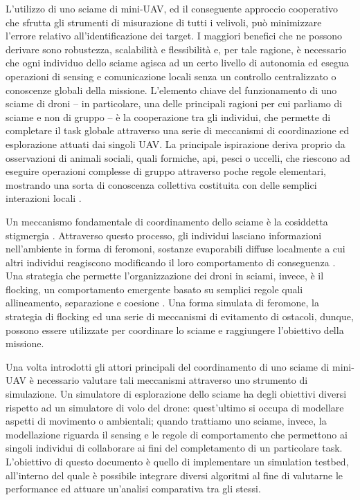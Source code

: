 L'utilizzo di uno sciame di mini-UAV, ed il conseguente approccio cooperativo che sfrutta gli strumenti di misurazione di tutti i velivoli, può minimizzare l'errore relativo all'identificazione dei target. 
I maggiori benefici che ne possono derivare sono robustezza, scalabilità e flessibilità e, per tale ragione, è necessario che ogni individuo dello sciame agisca ad un certo livello di autonomia ed esegua operazioni di sensing e comunicazione locali senza un controllo centralizzato o conoscenze globali della missione. 
L’elemento chiave del funzionamento di uno sciame di droni – in particolare, una delle principali ragioni per cui parliamo di sciame e non di gruppo – è la cooperazione tra gli individui, che permette di completare il task globale attraverso una serie di meccanismi di coordinazione ed esplorazione attuati dai singoli UAV. 
La principale ispirazione deriva proprio da osservazioni di animali sociali, quali formiche, api, pesci o uccelli, che riescono ad eseguire operazioni complesse di gruppo attraverso poche regole elementari, mostrando una sorta di conoscenza collettiva costituita con delle semplici interazioni locali \cite{brambilla2013swarm}.

Un meccanismo fondamentale di coordinamento dello sciame è la cosiddetta stigmergia \cite{sauter2005performance}. 
Attraverso questo processo, gli individui lasciano informazioni nell’ambiente in forma di feromoni, sostanze evaporabili diffuse localmente a cui altri individui reagiscono modificando il loro comportamento di conseguenza \cite{parunak2002digital}. 
Una strategia che permette l’organizzazione dei droni in sciami, invece, è il flocking, un comportamento emergente basato su semplici regole quali allineamento, separazione e coesione \cite{reynolds1987flocks}. 
Una forma simulata di feromone, la strategia di flocking ed una serie di meccanismi di evitamento di ostacoli, dunque, possono essere utilizzate per coordinare lo sciame e raggiungere l’obiettivo della missione.

Una volta introdotti gli attori principali del coordinamento di uno sciame di mini-UAV è necessario valutare tali meccanismi attraverso uno strumento di simulazione. 
Un simulatore di esplorazione dello sciame ha degli obiettivi diversi rispetto ad un simulatore di volo del drone: quest’ultimo si occupa di modellare aspetti di movimento o ambientali; quando trattiamo uno sciame, invece, la modellazione riguarda il sensing e le regole di comportamento che permettono ai singoli individui di collaborare ai fini del completamento di un particolare task. 
L’obiettivo di questo documento è quello di implementare un simulation testbed, all’interno del quale è possibile integrare diversi algoritmi al fine di valutarne le performance ed attuare un’analisi comparativa tra gli stessi.

